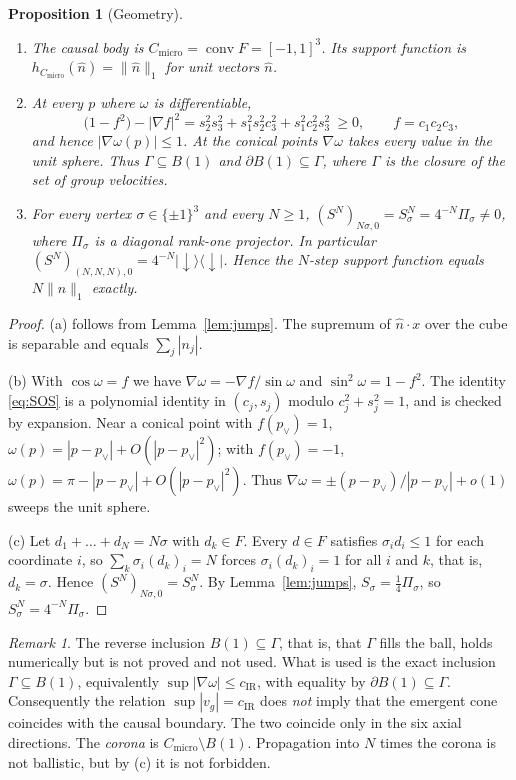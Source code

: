 \documentclass[11pt]{amsart}
\newtheorem{proposition}[theorem]{Proposition}
\theoremstyle{definition}
\theoremstyle{remark}
\newtheorem{remark}[theorem]{Remark}
\newcommand{\dn}{{\downarrow}}
\newcommand{\Cmicro}{C_{\mathrm{micro}}}
\newcommand{\cIR}{c_{\mathrm{IR}}}
\begin{document}
\begin{proposition}[Geometry]\label{prop:geometry}
\begin{enumerate}[label=(\alph*)]
\item The causal body is $\Cmicro=\operatorname{conv}F=[-1,1]^3$.  Its
  support function is $h_{\Cmicro}(\hat n)=\|\hat n\|_1$ for unit vectors
  $\hat n$.
\item At every $p$ where $\omega$ is differentiable,
  \begin{equation}\label{eq:SOS}
  \bigl(1-f^2\bigr)-|\nabla f|^2=s_2^2s_3^2+s_1^2s_2^2c_3^2+s_1^2c_2^2s_3^2\ \ge0,
  \qquad f=c_1c_2c_3,
  \end{equation}
  and hence $|\nabla\omega(p)|\le1$.  At the conical points $\nabla\omega$
  takes every value in the unit sphere.  Thus $\Gamma\subseteq B(1)$ and
  $\partial B(1)\subseteq\Gamma$, where $\Gamma$ is the closure of the set
  of group velocities.
\item For every vertex $\sigma\in\{\pm1\}^3$ and every $N\ge1$,
  $(S^N)_{N\sigma,0}=S_\sigma^N=4^{-N}\Pi_\sigma\ne0$, where $\Pi_\sigma$ is
  a diagonal rank-one projector.  In particular
  $(S^N)_{(N,N,N),0}=4^{-N}|\dn\rangle\langle\dn|$.  Hence the $N$-step
  support function equals $N\|\hat n\|_1$ exactly.
\end{enumerate}
\end{proposition}

\begin{proof}
(a) follows from Lemma~\ref{lem:jumps}.  The supremum of $\hat n\cdot x$ over
the cube is separable and equals $\sum_j|n_j|$.

(b) With $\cos\omega=f$ we have $\nabla\omega=-\nabla f/\sin\omega$ and
$\sin^2\omega=1-f^2$.  The identity \eqref{eq:SOS} is a polynomial identity
in $(c_j,s_j)$ modulo $c_j^2+s_j^2=1$, and is checked by expansion.  Near a
conical point with $f(p_\vee)=1$, $\omega(p)=|p-p_\vee|+O(|p-p_\vee|^2)$;
with $f(p_\vee)=-1$, $\omega(p)=\pi-|p-p_\vee|+O(|p-p_\vee|^2)$.
Thus $\nabla\omega=\pm(p-p_\vee)/|p-p_\vee|+o(1)$ sweeps the unit sphere.

(c) Let $d_1+\dots+d_N=N\sigma$ with $d_k\in F$.  Every $d\in F$ satisfies
$\sigma_i d_i\le1$ for each coordinate $i$, so
$\sum_k\sigma_i(d_k)_i=N$ forces $\sigma_i(d_k)_i=1$ for all $i$ and $k$,
that is, $d_k=\sigma$.  Hence $(S^N)_{N\sigma,0}=S_\sigma^N$.  By Lemma~\ref{lem:jumps},
$S_\sigma=\frac14\Pi_\sigma$, so $S_\sigma^N=4^{-N}\Pi_\sigma$.
\end{proof}

\begin{remark}
The reverse inclusion $B(1)\subseteq\Gamma$, that is, that $\Gamma$ fills
the ball, holds numerically but is not proved and not used.  What is used is
the exact inclusion $\Gamma\subseteq B(1)$, equivalently
$\sup|\nabla\omega|\le\cIR$, with equality by $\partial B(1)\subseteq\Gamma$.  Consequently the relation
$\sup|v_g|=\cIR$ does \emph{not} imply that the emergent cone coincides with
the causal boundary.  The two coincide only in the six axial directions.
The \emph{corona} is $\Cmicro\setminus B(1)$.  Propagation into $N$ times
the corona is not ballistic, but by (c) it is not forbidden.
\end{remark}
\end{document}
